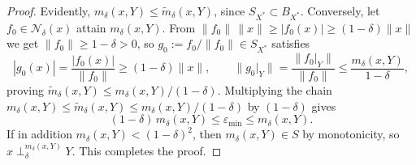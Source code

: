 \documentclass[10pt,a4paper]{amsart}
\begin{document}
\begin{proof}
\medskip

\noindent Evidently, $m_\delta(x,Y)\leq \widetilde m_\delta(x,Y)$, since $S_{X^*}\subset B_{X^*}$. Conversely, let $f_0 \in \mathscr{N}_\delta(x)$ attain $m_\delta(x,Y)$. From
$\|f_0\|\,\|x\|\geq|f_0(x)| \geq (1-\delta)\|x\|$ we get $\|f_0\| \geq 1-\delta > 0$, so
$g_0 := f_0/\|f_0\| \in S_{X^*}$ satisfies
\[
|g_0(x)| = \frac{|f_0(x)|}{\|f_0\|} \geq (1-\delta)\|x\|,\qquad
\|g_0|_Y\| = \frac{\|f_0|_Y\|}{\|f_0\|}\leq \frac{m_\delta(x,Y)}{1-\delta},
\]
proving $\widetilde m_\delta(x,Y)\leq m_\delta(x,Y)/(1-\delta)$. Multiplying the chain
$m_\delta(x,Y)\leq \widetilde m_\delta(x,Y)\leq m_\delta(x,Y)/(1-\delta)$ by $(1-\delta)$
gives
\[
(1-\delta)\,m_\delta(x,Y) \leq \varepsilon_{\min} \leq m_\delta(x,Y).
\]
If in addition $m_\delta(x,Y)<(1-\delta)^2$, then $m_\delta(x,Y)\in S$ by monotonicity, so
$x \perp_\delta^{m_\delta(x,Y)} Y$. This completes the proof.
\end{proof}
\end{document}
